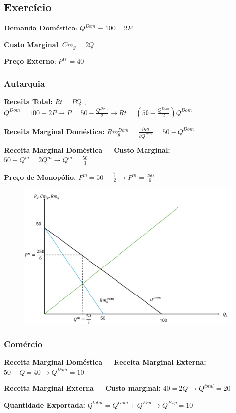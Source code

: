 \documentclass[a4paper,12pt]{article}[abntex2]
\begin{document}
\subsection{\textbf{Exercício}}
\textbf{Demanda Doméstica}: \(Q^{Dom}=100-2P\)

\textbf{Custo Marginal}: \(Cm_g=2Q\)

\textbf{Preço Externo}: \(P^W=40\)

\subsubsection{\textbf{Autarquia}}
\textbf{Receita Total:} \(Rt=PQ\) , \(Q^{Dom}=100-2P \rightarrow P = 50 - \frac{Q^{Dom}}{2} \rightarrow Rt=(50 - \frac{Q^{Dom}}{2})Q^{Dom}\)

\textbf{Receita Marginal Doméstica:} \(Rm_g^{Dom}=\frac{\partial Rt}{\partial Q^{Dom}}=50-Q^{Dom}\)

\textbf{Receita Marginal Doméstica = Custo Marginal:} \(50-Q^{m}=2Q^{m}\rightarrow Q^{m}=\frac{50}{3}\)

\textbf{Preço de Monopólio:} \(P^m=50 - \frac{\frac{50}{3}}{2} \rightarrow P^m=\frac{250}{6}\)

\begin{figure}[H]
    \centering
    \includegraphics[width=0.7\linewidth]{Imagens/a19i5.png}
\end{figure}

\subsubsection{\textbf{Comércio}}

\textbf{Receita Marginal Doméstica = Receita Marginal Externa:} \(50 - Q= 40\rightarrow Q^{Dom}=10 \)

\textbf{Receita Marginal Externa = Custo marginal:} \(40=2Q \rightarrow Q^{total}=20\)

\textbf{Quantidade Exportada:} \(Q^{total}=Q^{Dom}+Q^{Exp}\rightarrow Q^{Exp}=10\)
\end{document}
